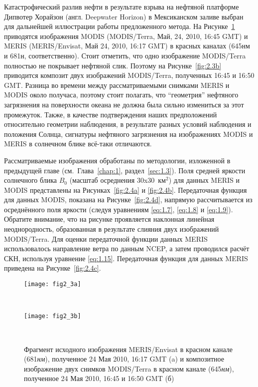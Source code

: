 Катастрофический разлив нефти в результате взрыва на нефтяной платформе Дипвотер Хорайзон (англ. Deepwater Horizon) в Мексиканском заливе выбран для дальнейшей иллюстрации работы предложенного метода. На Рисунке~\ref{fig:2.3} приводятся изображения MODIS (MODIS/Terra, Май, 24, 2010, 16:45 GMT) и MERIS (MERIS/Envisat, Май 24, 2010, 16:17 GMT) в красных каналах (645нм и 681н, соответственно). Стоит отметить, что одно изображение MODIS/Terra полностью не покрывает нефтяной слик. Поэтому на Рисунке~\ref{fig:2.3b} приводится композит двух изображений MODIS/Terra, полученных 16:45 и 16:50 GMT. Разница во времени между рассматриваемыми снимками MERIS и MODIS около получаса, поэтому стоит полагать, что ``геометрия'' нефтяного загрязнения на поверхности океана не должна была сильно измениться за этот промежуток. Также, в качестве подтверждения наших предположений относительно геометрии наблюдения, в результате разных условий наблюдения и положения Солнца, сигнатуры нефтяного загрязнения на изображениях MODIS и MERIS в солнечном блике всё-таки отличаются.

Рассматриваемые изображения обработаны по методологии, изложенной в предыдущей главе (см.~Глава~\ref{chap:1}, раздел~\ref{sec:1.3}). Поля средней яркости солнечного блика $B_{0} $ (масштаб осреднения 30x30~км${}^{2}$) для данных MERIS и MODIS представлены на Рисунках~\ref{fig:2.4a} и \ref{fig:2.4b}. Передаточная функция для данных MODIS, показана на Рисунке~\ref{fig:2.4d}, напрямую рассчитывается из осреднённого поля яркости (следуя уравнениям \eqref{eq:1.7}, \eqref{eq:1.8} и \eqref{eq:1.9}). Обратите внимание, что на рисунке проявляется наклонная линейная неоднородность, образованная в результате слияния двух изображений MODIS/Terra. Для оценки передаточной функции данных MERIS использовалось направление ветра по данным NCEP, а затем проводился расчёт СКН, используя уравнение \eqref{eq:1.15}. Передаточная функция для данных MERIS приведена на Рисунке~\ref{fig:2.4c}.



\begin{figure}[H]
	\centering
	\begin{minipage}{.93\textwidth}
		\subcaptionbox{\label{fig:2.3a}}
		{\texttt{[image: fig2\_3a]}}
	\end{minipage}
   	\hfill
	\\
	\begin{minipage}{.95\textwidth}
		\subcaptionbox{\label{fig:2.3b}}
		{\texttt{[image: fig2\_3b]}}
	\end{minipage}
    \\
    \caption{Фрагмент исходного изображения MERIS/Envisat в красном канале (681\textit{нм}), полученное 24 Мая 2010, 16:17 GMT (a) и композитное изображение двух снимков MODIS/Terra в красном канале (645\textit{нм}), полученное 24 Мая 2010, 16:45 и 16:50 GMT (б)}
    \label{fig:2.3}
\end{figure}



